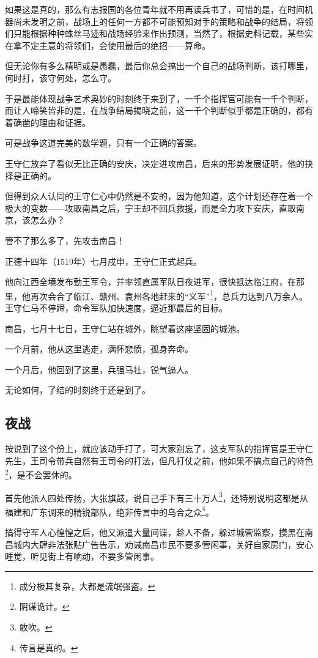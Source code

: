 \begin{multicols}{\theparacolNo}
如果这是真的，那么有志报国的各位青年就不用再读兵书了，可惜的是，在时间机器尚未发明之前，战场上的任何一方都不可能预知对手的策略和战争的结局，将领们只能根据种种蛛丝马迹和战场经验来作出预测，当然了，根据史料记载，某些实在拿不定主意的将领们，会使用最后的绝招——算命。

但无论你有多么精明或是愚蠢，最后你总会搞出一个自己的战场判断，该打哪里，何时打，该守何处，怎么守。

于是最能体现战争艺术奥妙的时刻终于来到了，一千个指挥官可能有一千个判断，而让人啼笑皆非的是，在战争结局揭晓之前，这一千个判断似乎都是正确的，都有着确凿的理由和证据。

可是战争这道完美的数学题，只有一个正确的答案。

王守仁放弃了看似无比正确的安庆，决定进攻南昌，后来的形势发展证明，他的抉择是正确的。

但得到众人认同的王守仁心中仍然是不安的，因为他知道，这个计划还存在着一个极大的变数——攻取南昌之后，宁王却不回兵救援，而是全力攻下安庆，直取南京，该怎么办？

管不了那么多了，先攻击南昌！

正德十四年（1519年）七月戍申，王守仁正式起兵。

他向江西全境发布勤王军令，并率领直属军队日夜进军，很快抵达临江府，在那里，他再次会合了临江、赣州、袁州各地赶来的“义军”\footnote{成分极其复杂，大都是流氓强盗。}，总兵力达到八万余人。王守仁马不停蹄，命令军队加快速度，逼近那最后的目标。

南昌，七月十七日，王守仁站在城外，眺望着这座坚固的城池。

一个月前，他从这里逃走，满怀悲愤，孤身奔命。

一个月后，他回到了这里，兵强马壮，锐气逼人。

无论如何，了结的时刻终于还是到了。

\subsection{夜战}
按说到了这个份上，就应该动手打了，可大家别忘了，这支军队的指挥官是王守仁先生，王司令带兵自然有王司令的打法，但凡打仗之前，他如果不搞点自己的特色\footnote{阴谋诡计。}，是不会罢休的。

首先他派人四处传扬，大张旗鼓，说自己手下有三十万人\footnote{敢吹。}，还特别说明这都是从福建和广东调来的精锐部队，绝非传言中的乌合之众\footnote{传言是真的。}。

搞得守军人心惶惶之后，他又派遣大量间谍，趁人不备，躲过城管监察，摸黑在南昌城内大肆非法张贴广告告示，劝诫南昌市民不要多管闲事，关好自家房门，安心睡觉，听见街上有响动，不要多管闲事。


\end{multicols}
